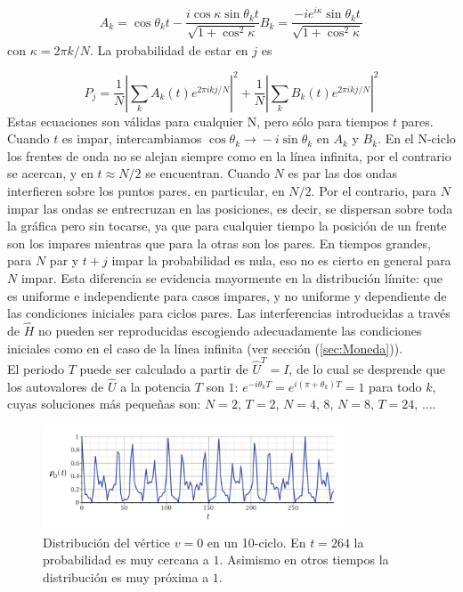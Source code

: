 \begin{align}
    A_k=\cos\theta_k t-\dfrac{i\cos\kappa\sin\theta_kt}{\sqrt{1+\cos^2\kappa }}
    B_k=\dfrac{-ie^{i\kappa}\sin\theta_kt}{\sqrt{1+\cos^2\kappa}}
\end{align}
con $\kappa=2\pi k/N$. La probabilidad de estar en $j$ es

\begin{equation}
    P_j=\dfrac{1}{N}|\sum_{k}A_k(t)e^{2\pi ikj/N}|^2+\dfrac{1}{N}|\sum_{k}B_k(t)e^{2\pi ikj/N}|^2
\end{equation}
Estas ecuaciones son válidas para cualquier N, pero sólo para tiempos $t$ pares. Cuando $t$ es impar, intercambiamos $\cos\theta_k\xrightarrow{}-i\sin\theta_k$ en $A_k$ y $B_k$. 
En el N-ciclo los frentes de onda no se alejan siempre como en la línea infinita, por el contrario se acercan, y en $t\approx N/2$ se encuentran. Cuando $N$ es par las dos ondas interfieren sobre los puntos pares, en particular, en $N/2$. Por el contrario, para $N$ impar las ondas se entrecruzan en las posiciones, es decir, se dispersan sobre toda la gráfica pero sin tocarse, ya que para cualquier tiempo la posición de un frente son los impares mientras que para la otras son los pares. En tiempos grandes, para $N$ par y $t+j$ impar la probabilidad es nula, eso no es cierto en general para $N$ impar. Esta diferencia se evidencia mayormente en la distribución límite: que es uniforme e independiente para casos impares, y no uniforme y dependiente de las condiciones iniciales para ciclos pares.
Las interferencias introducidas a través de $\hat{H}$ no pueden ser reproducidas escogiendo adecuadamente las condiciones iniciales como en el caso de la línea infinita (ver sección (\ref{sec:Moneda})).\\

El periodo $T$ puede ser calculado a partir de $\hat{U}^T=I$, de lo cual se desprende que los autovalores de $\hat{U} $ a la potencia $T$ son $1$: $e^{-i\theta_k T}=e^{i(\pi+\theta_k)T}=1$ para todo $k$, cuyas soluciones más pequeñas son: $N=2,\, T=2$, $N=4,\,8$, $N=8,\,T=24$, $\dots$.

\begin{figure}[ht]
\centering
\includegraphics[width=0.8\textwidth]{Kap4/Quasiperiodyc10CyclePortugal.png}
\caption{Distribución del vértice $v=0$ en un 10-ciclo. En $t=264$ la probabilidad es muy cercana a $1$. Asimismo en otros tiempos la distribución es muy próxima a $1$.
\cite{portugal2013quantum}}
\end{figure}

